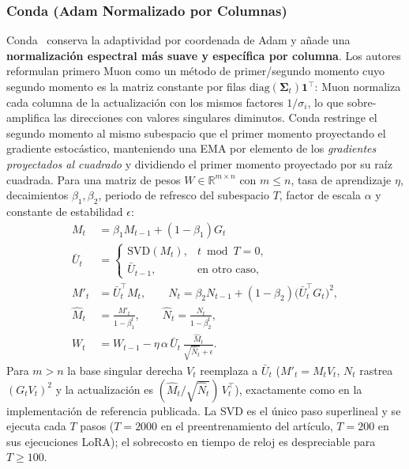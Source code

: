 \subsubsection{Conda (Adam Normalizado por Columnas)}
Conda~\citep{wang_conda_2025} conserva la adaptividad por coordenada de Adam y añade una
\textbf{normalización espectral más suave y específica por columna}. Los autores
reformulan primero Muon como un método de primer/segundo momento cuyo segundo momento es
la matriz constante por filas $\mathrm{diag}(\mathbf{\Sigma}_t)\mathbf{1}^\top$: Muon
normaliza cada columna de la actualización con los mismos factores $1/\sigma_i$, lo que
sobre-amplifica las direcciones con valores singulares diminutos. Conda restringe el
segundo momento al mismo subespacio que el primer momento proyectando el gradiente
estocástico, manteniendo una EMA por elemento de los \emph{gradientes proyectados al
cuadrado} y dividiendo el primer momento proyectado por su raíz cuadrada. Para una matriz
de pesos $W \in \mathbb{R}^{m \times n}$ con $m \le n$, tasa de aprendizaje $\eta$,
decaimientos $\beta_1,\beta_2$, periodo de refresco del subespacio $T$, factor de escala
$\alpha$ y constante de estabilidad $\epsilon$:
\begin{align}
M_t &= \beta_1 M_{t-1} + (1-\beta_1) G_t \\
\bar U_t &=
\begin{cases}
\mathrm{SVD}(M_t), & t \bmod T = 0, \\
\bar U_{t-1}, & \text{en otro caso},
\end{cases} \\
M'_t &= \bar U_t^\top M_t, \qquad
N_t = \beta_2 N_{t-1} + (1-\beta_2)\big(\bar U_t^\top G_t\big)^2, \\
\widehat M_t &= \frac{M'_t}{1-\beta_1^t}, \qquad
\widehat N_t = \frac{N_t}{1-\beta_2^t}, \\
W_t &= W_{t-1} - \eta\,\alpha\,\bar U_t\,
      \frac{\widehat M_t}{\sqrt{\widehat N_t} + \epsilon}.
\end{align}
Para $m > n$ la base singular derecha $V_t$ reemplaza a $\bar U_t$ ($M'_t = M_t V_t$,
$N_t$ rastrea $(G_t V_t)^2$ y la actualización es
$(\widehat M_t/\sqrt{\widehat N_t})\,V_t^\top$), exactamente como en la implementación de
referencia publicada. La SVD es el único paso superlineal y se ejecuta cada $T$ pasos
($T=2000$ en el preentrenamiento del artículo, $T=200$ en sus ejecuciones LoRA); el
sobrecosto en tiempo de reloj es despreciable para $T \ge 100$.

